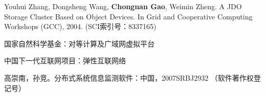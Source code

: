 \begin{resume}
\begin{enumerate}[{[}1{]}]
  \item Youhui Zhang, Dongsheng Wang, \textbf{Chongnan Gao}, Weimin Zheng. A
  JDO Storage Cluster Based on Object Devices. In Grid and Cooperative
  Computing Workshops (GCC), 2004. (SCI索引号：8337165)

  \end{enumerate}

  \begin{enumerate}[{[}1{]}]

  \item 国家自然科学基金：对等计算及广域网虚拟平台

  \item 中国下一代互联网项目：弹性互联网络
  \end{enumerate}

  \begin{enumerate}[{[}1{]}]

  \item 高崇南，孙竞。分布式系统信息监测软件：中国，2007SRBJ2932
  （软件著作权登记号）

  \end{enumerate}
\end{resume}
